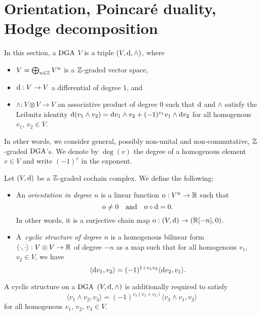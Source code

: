 \documentclass[\MainFolder/Text.tex]{subfiles}
\begin{document}
\section{Orientation, Poincar\'e duality, Hodge decomposition}
\label{SubSec:CycStr}

In this section, a $\mathrm{DGA}$ $V$ is a triple $(V,\mathrm{d},\wedge)$, where 
\begin{itemize}
\item $V = \bigoplus_{n\in \mathbb{Z}} V^n$ is a $\mathbb{Z}$-graded vector space,
\item $\mathrm{d}: V\rightarrow V$ a differential of degree $1$, and
\item $\wedge: V\otimes V \rightarrow V$ an associative product of degree $0$ such that $\mathrm{d}$ and $\wedge$ satisfy the Leibnitz identity $\mathrm{d}(v_1 \wedge v_2) = \mathrm{d} v_1 \wedge v_2 + (-1)^{v_1} v_1 \wedge\mathrm{d} v_2$ for all homogenous $v_1$, $v_2\in V$.
\end{itemize}
In other words, we consider general, possibly non-unital and non-commutative, $\mathbb{Z}$-graded $\mathrm{DGA}$'s. We denote by $\deg(v)$ the degree of a homogenous element $v\in V$ and write $(-1)^v$ in the exponent.
 

\begin{Definition}\label{Def:CycStr} 
Let $(V,\mathrm{d})$ be a $\mathbb{Z}$-graded cochain complex. We define the following:
\begin{itemize}
\item An \emph{orientation in degree $n$} is a linear function $\mathrm{o} : V^n \rightarrow \mathbb{R}$ such that
\[\mathrm{o} \neq 0\quad\text{and}\quad\mathrm{o} \circ \mathrm{d} = 0. \]
In other words, it is a surjective chain map $\mathrm{o} : (V,\mathrm{d}) \rightarrow (\mathbb{R}[-n],0)$.
\item A~\emph{cyclic structure of degree $n$} is a homogenous bilinear form $\langle \cdot, \cdot \rangle : V \otimes V \rightarrow \mathbb{R}$ of degree $-n$ as a map such that for all homogenous $v_1$, $v_2\in V$, we have
\begin{equation}\label{Eq:CycStr}
\langle \mathrm{d} v_1, v_2\rangle = (-1)^{1+v_1 v_2} \langle \mathrm{d} v_2, v_1 \rangle.
\end{equation}
\end{itemize}
A cyclic structure on a $\mathrm{DGA}$ $(V,\mathrm{d},\wedge)$ is additionally required to satisfy  
\begin{equation}\label{Eq:CycStrII}
\langle v_1 \wedge v_2, v_3 \rangle = (-1)^{v_3(v_1 + v_2)}\langle v_3\wedge v_1, v_2 \rangle
\end{equation}
for all homogenous $v_1$, $v_2$, $v_3\in V$.
\end{Definition}
\end{document}
